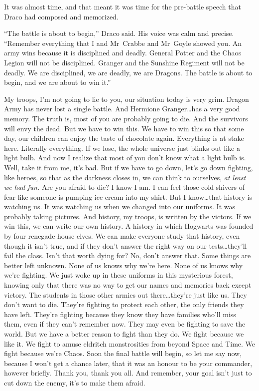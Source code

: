 It was almost time, and that meant it was time for the pre-battle speech that Draco had composed and memorized.

“The battle is about to begin,” Draco said. His voice was calm and precise. “Remember everything that I and Mr~Crabbe and Mr~Goyle showed you. An army wins because it is disciplined and deadly. General Potter and the Chaos Legion will not be disciplined. Granger and the Sunshine Regiment will not be deadly. We are disciplined, we are deadly, we are Dragons. The battle is about to begin, and we are about to win it.”


My troops, I’m not going to lie to you, our situation today is very grim. Dragon Army has never lost a single battle. And Hermione Granger…has a very good memory. The truth is, most of you are probably going to die. And the survivors will envy the dead. But we have to win this. We have to win this so that some day, our children can enjoy the taste of chocolate again. Everything is at stake here. Literally everything. If we lose, the whole universe just blinks out like a light bulb. And now I realize that most of you don’t know what a light bulb is. Well, take it from me, it’s bad. But if we have to go down, let’s go down fighting, like heroes, so that as the darkness closes in, we can think to ourselves, \emph{at least we had fun.} Are you afraid to die? I know I am. I can feel those cold shivers of fear like someone is pumping ice-cream into my shirt. But I know…that history is watching us. It was watching us when we changed into our uniforms. It was probably taking pictures. And history, my troops, is written by the victors. If we win this, we can write our own history. A history in which Hogwarts was founded by four renegade house elves. We can make everyone study that history, even though it isn’t true, and if they don’t answer the right way on our tests…they’ll fail the class. Isn’t that worth dying for? No, don’t answer that. Some things are better left unknown. None of us knows why we’re here. None of us knows why we’re fighting. We just woke up in these uniforms in this mysterious forest, knowing only that there was no way to get our names and memories back except victory. The students in those other armies out there…they’re just like us. They don’t want to die. They’re fighting to protect each other, the only friends they have left. They’re fighting because they know they have families who’ll miss them, even if they can’t remember now. They may even be fighting to save the world. But we have a better reason to fight than they do. We fight because we like it. We fight to amuse eldritch monstrosities from beyond Space and Time. We fight because we’re Chaos. Soon the final battle will begin, so let me say now, because I won’t get a chance later, that it was an honour to be your commander, however briefly. Thank you, thank you all. And remember, your goal isn’t just to cut down the enemy, it’s to make them afraid.

